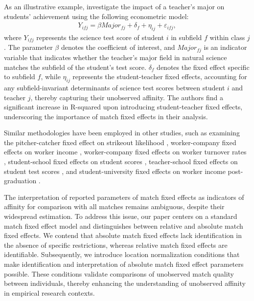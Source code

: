 \documentclass[12pt]{article}
\begin{document}
As an illustrative example, \cite{inoue2023teachers} investigate the impact of a teacher's major on students' achievement using the following econometric model:
\begin{align*}
    Y_{ifj} = \beta Major_{fj} + \delta_f + \eta_{ij} + \varepsilon_{ifj},
\end{align*}
where \( Y_{ifj} \) represents the science test score of student \( i \) in subfield \( f \) within class \( j \). The parameter \( \beta \) denotes the coefficient of interest, and \( Major_{fj} \) is an indicator variable that indicates whether the teacher's major field in natural science matches the subfield of the student's test score. \( \delta_{f} \) denotes the fixed effect specific to subfield \( f \), while \( \eta_{ij} \) represents the student-teacher fixed effects, accounting for any subfield-invariant determinants of science test scores between student \( i \) and teacher \( j \), thereby capturing their unobserved affinity. The authors find a significant increase in R-squared upon introducing student-teacher fixed effects, underscoring the importance of match fixed effects in their analysis.

Similar methodologies have been employed in other studies, such as examining the pitcher-catcher fixed effect on strikeout likelihood \citep{biolsi2022task}, worker-company fixed effects on worker income \citep{woodcock2015match, mittag2019simple}, worker-company fixed effects on worker turnover rates \citep{ferreira2011measuring}, student-school fixed effects on student scores \citep{ovidi2022parents}, teacher-school fixed effects on student test scores \citep{jackson2013match}, and student-university fixed effects on worker income post-graduation \citep{dillon2020consequences}. 

The interpretation of reported parameters of match fixed effects as indicators of affinity for comparison with all matches remains ambiguous, despite their widespread estimation. To address this issue, our paper centers on a standard match fixed effect model and distinguishes between relative and absolute match fixed effects. We contend that absolute match fixed effects lack identification in the absence of specific restrictions, whereas relative match fixed effects are identifiable.
Subsequently, we introduce location normalization conditions that make identification and interpretation of absolute match fixed effect parameters possible. These conditions validate comparisons of unobserved match quality between individuals, thereby enhancing the understanding of unobserved affinity in empirical research contexts.
\end{document}
